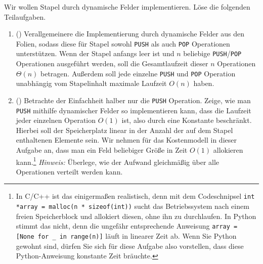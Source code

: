 \documentclass{uebung_cs}
\begin{document}
\begin{aufgabe}
	Wir wollen Stapel durch dynamische Felder implementieren.
	Löse die folgenden Teilaufgaben.
	\begin{enumerate}
		\item (\hard) Verallgemeinere die Implementierung durch dynamische Felder aus den Folien, sodass diese für Stapel sowohl \texttt{PUSH} als auch \texttt{POP} Operationen unterstützen.
		Wenn der Stapel anfangs leer ist und $n$ beliebige \texttt{PUSH}/\texttt{POP} Operationen ausgeführt werden, soll die Gesamtlaufzeit dieser $n$ Operationen $\Theta(n)$ betragen. Außerdem soll jede einzelne \texttt{PUSH} und \texttt{POP} Operation unabhängig vom Stapelinhalt maximale Laufzeit $O(n)$ haben.
		\item (\veryhard) Betrachte der Einfachheit halber nur die \texttt{PUSH} Operation.
		Zeige, wie man \texttt{PUSH} mithilfe dynamischer Felder so implementieren kann, dass die Laufzeit jeder einzelnen Operation $O(1)$ ist, also durch eine Konstante beschränkt.
		Hierbei soll der Speicherplatz linear in der Anzahl der auf dem Stapel enthaltenen Elemente sein.
		Wir nehmen für das Kostenmodell in dieser Aufgabe an, dass man ein Feld beliebiger Größe in Zeit $O(1)$ allokieren kann.\footnote{In C/C++ ist das einigermaßen realistisch, denn mit dem Codeschnipsel \texttt{int *array = malloc(n * sizeof(int))} sucht das Betriebssystem nach einem freien Speicherblock und allokiert diesen, ohne ihn zu durchlaufen. In Python stimmt das nicht, denn die ungefähr entsprechende Anweisung \texttt{array = [None for \_ in range(n)]} läuft in linearer Zeit ab. Wenn Sie Python gewohnt sind, dürfen Sie sich für diese Aufgabe also vorstellen, dass diese Python-Anweisung konstante Zeit bräuchte.}
		\textit{Hinweis:} Überlege, wie der Aufwand gleichmäßig über alle Operationen verteilt werden kann. 
	\end{enumerate}
\end{aufgabe}
\end{document}
